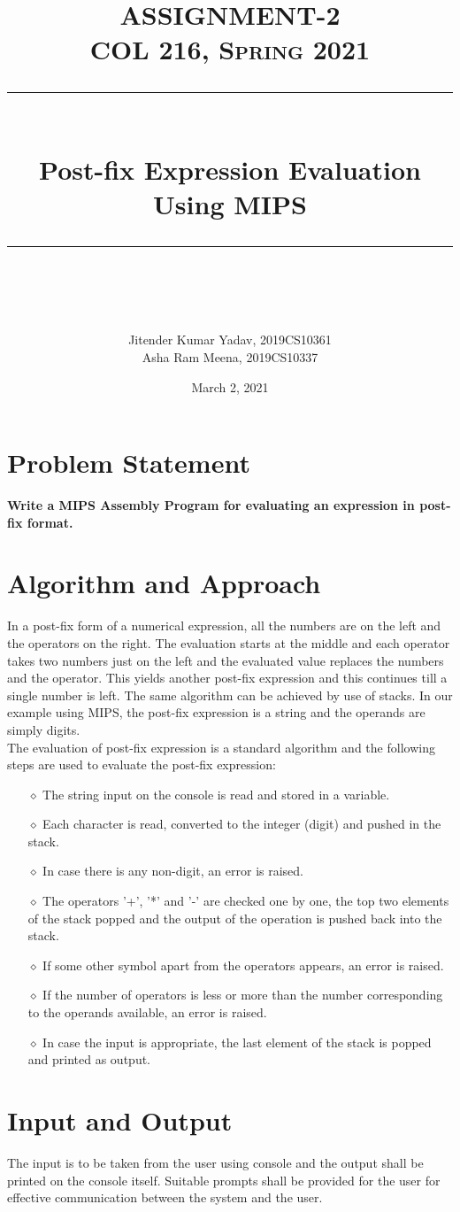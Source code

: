 \documentclass{article} %
\title{
\normalfont \large
\textsc{ASSIGNMENT-2
\vspace{10pt}
\\COL 216, Spring 2021} \\
[10pt] 
\rule{\linewidth}{0.5pt} \\[6pt] 
\Large Post-fix Expression Evaluation Using MIPS \\
\rule{\linewidth}{2pt}  \\[10pt]
}
\author{Jitender Kumar Yadav, 2019CS10361
\\Asha Ram Meena, 2019CS10337}
\date{\normalsize March 2, 2021}
\begin{document}
\maketitle
\section{Problem Statement}
\textbf{Write a MIPS Assembly Program for evaluating an expression in post-fix format.}

\section{Algorithm and Approach}
In a post-fix form of a numerical expression, all the numbers are on the left and the operators on the right. The evaluation starts at the middle and each operator takes two numbers just on the left and the evaluated value replaces the numbers and the operator. This yields another post-fix expression and this continues till a single number is left. The same algorithm can be achieved by use of stacks. In our example using MIPS, the post-fix expression is a string and the operands are simply digits.
\\The evaluation of post-fix expression is a standard algorithm and the following steps are used to evaluate the post-fix expression:
\begin{itemize}
    \item[$\diamond$] The string input on the console is read and stored in a variable.
    \item[$\diamond$] Each character is read, converted to the integer (digit) and pushed in the stack.
    \item[$\diamond$] In case there is any non-digit, an error is raised.
    \item[$\diamond$] The operators '+', '*' and '-' are checked one by one, the top two elements of the stack popped and the output of the operation is pushed back into the stack.
    \item[$\diamond$] If some other symbol apart from the operators appears, an error is raised.
    \item[$\diamond$] If the number of operators is less or more than the number corresponding to the operands available, an error is raised.
    \item[$\diamond$] In case the input is appropriate, the last element of the stack is popped and printed as output.
\end{itemize}

\section{Input and Output}
The input is to be taken from the user using console and the output shall be printed on the console itself. Suitable prompts shall be provided for the user for effective communication between the system and the user.
\end{document}
